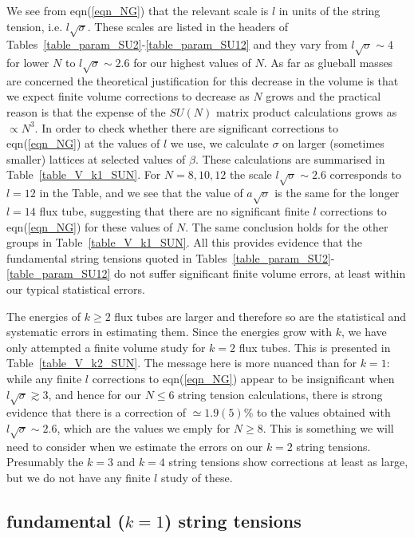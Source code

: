 \documentclass[12pt]{article}
\begin{document}
We see from eqn(\ref{eqn_NG}) that the relevant scale is $l$ in units of the string tension,
i.e. $l\surd\sigma$. These scales are listed in the headers of
Tables~\ref{table_param_SU2}-\ref{table_param_SU12} and they vary from $l\surd\sigma\sim 4$
for lower $N$ to $l\surd\sigma\sim 2.6$ for our highest values of $N$. As far as glueball
masses are concerned the theoretical justification for this decrease in the volume
is that we expect finite volume corrections to decrease as $N$ grows and the practical
reason is that the expense of the $SU(N)$ matrix product calculations grows as $\propto N^3$. 
In order to check whether there are significant corrections to eqn(\ref{eqn_NG}) at the values
of $l$ we use, we calculate $\sigma$ on larger (sometimes smaller) lattices at selected values of
$\beta$. These calculations are summarised in Table~\ref{table_V_k1_SUN}. For $N=8,10,12$
the scale $l\surd\sigma\sim 2.6$ corresponds to $l=12$ in the Table, and we see that the
value of $a\surd\sigma$ is the same for the longer $l=14$ flux tube, suggesting that there are no
significant finite $l$ corrections to eqn(\ref{eqn_NG}) for these values of $N$. The same
conclusion holds for the other groups in Table~\ref{table_V_k1_SUN}. All this provides evidence
that the fundamental string tensions quoted in Tables~\ref{table_param_SU2}-\ref{table_param_SU12}
do not suffer significant finite volume errors, at least within our typical statistical errors.

The energies of $k\geq 2$ flux tubes are larger and therefore so are the statistical
and systematic errors in estimating them. Since the energies grow with $k$, we have
only attempted a finite volume study for $k=2$ flux tubes. This is presented in
Table~\ref{table_V_k2_SUN}. The message here is more nuanced than for $k=1$: while any finite $l$
corrections to eqn(\ref{eqn_NG}) appear to be insignificant when $l\surd\sigma \gtrsim 3$,
and hence for our $N \leq 6$ string tension calculations, there is strong evidence that
there is a correction of $\simeq 1.9(5)\%$ to the values obtained with $l\surd\sigma \sim 2.6$,
which are the values we emply for $N\geq 8$. This is something
we will need to consider when we estimate the errors on our $k=2$ string tensions. Presumably
the $k=3$ and $k=4$ string tensions show corrections at least as large, but we do not
have any finite $l$ study of these. 


%
%
\subsection{fundamental ($k=1$) string tensions}
\label{subsection_k1strings}
\end{document}

